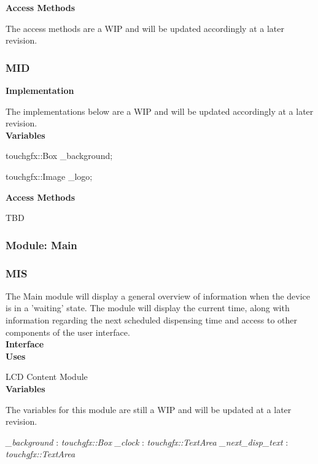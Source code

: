 \documentclass[12pt,titlepage]{article}
\begin{document}
\noindent \textbf{Access Methods}

\noindent The access methods are a WIP and will be updated accordingly at a later revision.

\subsubsection*{MID}

\noindent \textbf{Implementation} 

\noindent The implementations below are a WIP and will be updated accordingly at a later revision.\\

\noindent \textbf{Variables}

touchgfx::Box \_background; \par
touchgfx::Image \_logo; \newline

\noindent \textbf{Access Methods} 

TBD

\subsubsection{Module: Main}
\subsubsection*{MIS}

\noindent The Main module will display a general overview of information when the device is in a 'waiting' state. The module will display the current time, along with information regarding the next scheduled dispensing time and access to other components of the user interface. \\

\noindent \textbf{Interface} \\

\noindent \textbf{Uses}

\noindent LCD Content Module \\

\noindent \textbf{Variables}

\noindent The variables for this module are still a WIP and will be updated at a later revision. \newline

\noindent \textit{\_background} : \textit{touchgfx::Box} \newline
\noindent \textit{\_clock} : \textit{touchgfx::TextArea} \newline
\noindent \textit{\_next\_disp\_text} : \textit{touchgfx::TextArea} \newline
\end{document}
